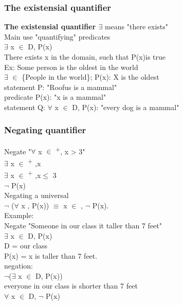 \documentclass[11pt]{article}
\begin{document}
\subsubsection{The existensial quantifier}
\label{sec:org28c0021}
\textbf{The existensial quantifier \(\exists\)} means "there exists"\\

Main use "quantifying" predicates\\
\(\exists\) x \(\in\) D, P(x)\\
There exists x in the domain, such that P(x)is true\\

Ex: Some person is the oldest in the world\\
\(\exists\) \(\in\) \{People in the world\}; P(x): X is the oldest\\

statement P: "Roofus is a mammal"\\
predicate P(x): "x is a mammal"\\
statement Q: \(\forall\) x \(\in\) D, P(x): "every dog is a mammal"\\

\subsubsection{Negating quantifier}
\label{sec:orgbbf7da8}
Negate "\(\forall\) x \(\in\) \textsuperscript{+}, x > 3"\\
\(\exists\) x \(\in\) \textsuperscript{+ },x \\
\(\exists\) x \(\in\) \textsuperscript{+ },x\(\le\) 3\\
\(\neg{}\) P(x)\\

Negating a universal\\
\(\neg{}\) (\(\forall\) x , P(x)) \(\equiv\) x \(\in\) , \(\neg{}\) P(x).\\

Example:\\
Negate "Someone in our class it taller than 7 feet"\\
\(\exists\) x \(\in\) D, P(x)\\
D = our class\\
P(x) = x is taller than 7 feet.\\

negation:\\
\(\neg{}\)(\(\exists\) x \(\in\) D, P(x))\\
everyone in our class is shorter than 7 feet\\
\(\forall\) x \(\in\) D, \(\neg{}\) P(x)\\
\end{document}
